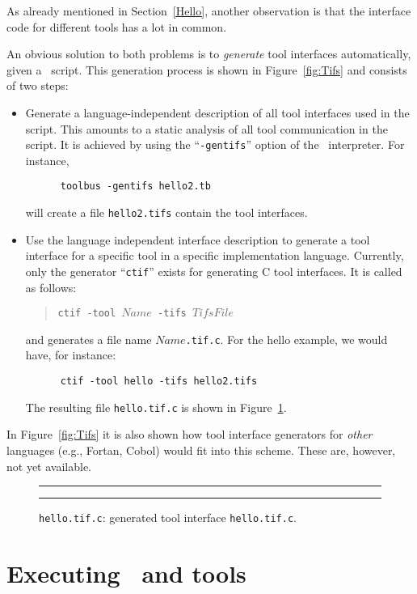 As already mentioned in Section~\ref{Hello}, another observation
is that the interface code for different tools has a lot in common.

An obvious solution to both problems is to {\em generate}
tool interfaces automatically, given a \T\ script.
This generation process is shown in Figure~\ref{fig:Tifs}
and consists of two steps:

\begin{itemize}
\item Generate a language-independent
description of all tool interfaces used in the script.
This amounts to a static analysis of all tool communication
in the script. It is achieved by using the ``{\tt -gentifs}''
option of the \TB\ interpreter. For instance,
\begin{verbatim}
      toolbus -gentifs hello2.tb
\end{verbatim}
will create a file {\tt hello2.tifs} contain the tool interfaces.

\item Use the language independent interface description
to generate a tool interface for a specific tool in a specific
implementation language. Currently, only the generator ``{\tt ctif}''
exists for generating C tool interfaces. It is called as follows:
\begin{quote}
      {\tt ctif -tool $Name$ -tifs $TifsFile$}
\end{quote}
and generates a file name $Name${\tt .tif.c}.
For the hello example, we would have, for instance:
\begin{verbatim}
      ctif -tool hello -tifs hello2.tifs
\end{verbatim}
The resulting file {\tt hello.tif.c} is shown in
Figure~\ref{fig:hello.tif.c}.
\end{itemize}

In Figure~\ref{fig:Tifs} it is also shown how tool interface generators
for {\em other} languages (e.g., Fortan, Cobol) would fit into this scheme.
These are, however, not yet available.

\begin{figure}
\rule{\textwidth}{0.5mm}

  \caption{{\tt hello.tif.c}: generated tool interface {\tt hello.tif.c}.}
  \label{fig:hello.tif.c}
\rule{\textwidth}{0.5mm}
\end{figure}

\section{\label{Executing}Executing \TB\ and tools}


